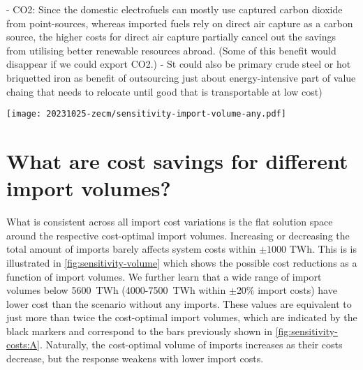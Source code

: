 - CO2: Since the domestic electrofuels can mostly use captured carbon dioxide from point-sources, whereas imported fuels rely on direct air capture as a carbon source, the higher costs for direct air capture partially cancel out the savings from utilising better renewable resources abroad. (Some of this benefit would disappear if we could export CO2.)
- St could also be primary crude steel or hot briquetted iron as benefit of outsourcing just about energy-intensive part of value chaing that needs to relocate until good that is transportable at low cost)


\begin{figure*}
    \texttt{[image: 20231025-zecm/sensitivity-import-volume-any.pdf]}
    \caption{\textbf{Sensitivity of import volume on total system cost and composition.} 
        Dashed line splits total system cost into domestic and foreign cost.
        Dotted lines indicate the profile of lowest total system cost attainable for given import volumes and different levels of import costs.
        Markers denote the maximum cost reductions and cost-optimal import volume for a given import cost level (extreme points of the profiles).
        Steel is included in energy terms applying 2.1 kWh/kg as released by oxidation of iron.
        Cost alterations are uniformly applied to all carriers but electricity.
    }
    \label{fig:sensitivity-volume}
\end{figure*}

\section*{What are cost savings for different import volumes?}

What is consistent across all import cost variations is the flat solution space
around the respective cost-optimal import volumes. Increasing or decreasing the
total amount of imports barely affects system costs within $\pm 1000$ TWh. This
is is illustrated in \cref{fig:sensitivity-volume} which shows the possible cost
reductions as a function of import volumes. We further learn that a wide range
of import volumes below 5600~TWh (4000-7500~TWh within $\pm$20\% import costs)
have lower cost than the scenario without any imports. These values are
equivalent to just more than twice the cost-optimal import volumes, which are
indicated by the black markers and correspond to the bars previously shown in
\cref{fig:sensitivity-costs:A}. Naturally, the cost-optimal volume of imports
increases as their costs decrease, but the response weakens with lower import
costs.

